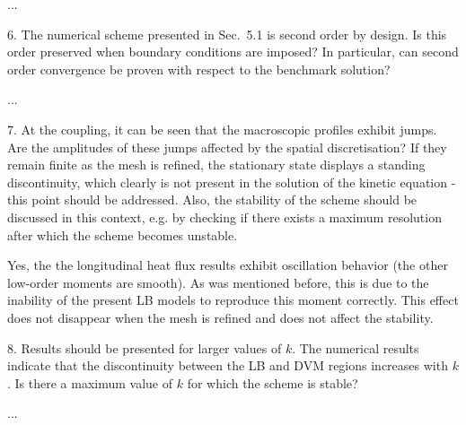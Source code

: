 \documentclass{article}
\begin{document}
...

\begin{leftbar}
\end{leftbar}

\begin{quoting}
    6. The numerical scheme presented in Sec.~5.1 is
    second order by design. Is this order preserved
    when boundary conditions are imposed? In particular,
    can second order convergence be proven with respect
    to the benchmark solution?
\end{quoting}

...

\begin{leftbar}
\end{leftbar}

\begin{quoting}
    7. At the coupling, it can be seen that the
    macroscopic profiles exhibit jumps. Are the
    amplitudes of these jumps affected by the spatial
    discretisation? If they remain finite as the
    mesh is refined, the stationary state displays
    a standing discontinuity, which clearly is not
    present in the solution of the kinetic equation -
    this point should be addressed. Also, the stability
    of the scheme should be discussed in this context,
    e.g. by checking if there exists a maximum
    resolution after which the scheme becomes unstable.
\end{quoting}

Yes, the the longitudinal heat flux results exhibit oscillation behavior
(the other low-order moments are smooth). As was mentioned before,
this is due to the inability of the present LB models to reproduce this moment correctly.
This effect does not disappear when the mesh is refined and does not affect the stability.

\begin{leftbar}
\end{leftbar}

\begin{quoting}
    8. Results should be presented for larger values of
    $k$. The numerical results indicate that the
    discontinuity between the LB and DVM regions increases
    with $k$. Is there a maximum value of $k$ for which
    the scheme is stable?
\end{quoting}

...

\begin{leftbar}
\end{leftbar}
\end{document}
